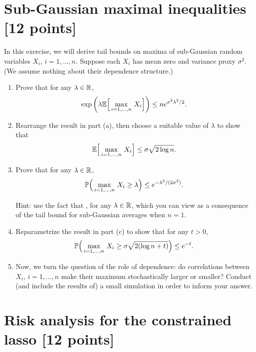 \documentclass{article}
\begin{document}
\section{Sub-Gaussian maximal inequalities [12 points]}

In this exercise, we will derive tail bounds on maxima of sub-Gaussian random
variables $X_i$, $i=1,\dots,n$. Suppose each $X_i$ has mean zero and variance
proxy $\sigma^2$. (We assume nothing about their dependence structure.)

\begin{enumerate}[label=(\alph*)]
\item Prove that for any $\lambda \in \R$,
  \marginpar{\small [3 pts]}
  \[
  \exp \bigg( \lambda \E\Big[ \max_{i=1,\dots,n} \, X_i \Big] \bigg) \leq n
  e^{\sigma^2 \lambda^2/2}.   
  \]

\item Rearrange the result in part (a), then choose a suitable value of
  $\lambda$ to show that     
  \marginpar{\small [2 pts]}
  \[
  \E \Big[ \max_{i=1,\dots,n} \, X_i \Big] \leq \sigma \sqrt{2 \log n}. 
  \]

\item Prove that for any $\lambda \in \R$,
  \marginpar{\small [2 pts]}
  \[
  \P \Big(\max_{i=1,\dots,n} \, X_i \geq \lambda \Big) \leq e^{-\lambda^2 /
    (2\sigma^2)}.  
  \]

  Hint: use the fact that , for any $\lambda \in \R$, which you can view as a
  consequence of the tail bound for sub-Gaussian averages when $n=1$. 

\item Reparametrize the result in part (c) to show that for any $t>0$,
  \marginpar{\small [1 pt]}
  \[
  \P \Big(\max_{i=1,\dots,n} \, X_i \geq \sigma \sqrt{2 (\log n + t)} \Big) 
  \leq e^{-t}.   
  \]

\item Now, we turn the question of the role of dependence: do correlations 
  between $X_i$, $i=1,\dots,n$ make their maximum stochastically larger or
  smaller? Conduct (and include the results of) a small simulation in order to
  inform your answer. 
  \marginpar{\small [4 pts]}
 \end{enumerate}

\section{Risk analysis for the constrained lasso [12 points]}
\end{document}
